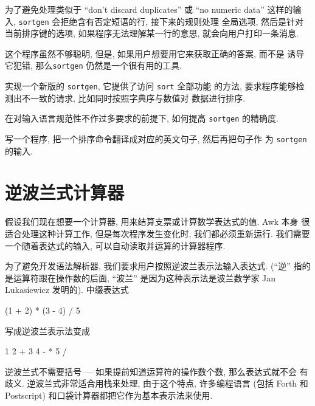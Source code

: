 
为了避免处理类似于 ``don't discard duplicates'' 或 ``no numeric data'' 
这样的输入, \texttt{sortgen} 会拒绝含有否定短语的行, 接下来的规则处理
全局选项, 然后是针对当前排序键的选项, 如果程序无法理解某一行的意思,
就会向用户打印一条消息.

这个程序虽然不够聪明, 但是, 如果用户想要用它来获取正确的答案, 而不是
诱导它犯错, 那么\texttt{sortgen} 仍然是一个很有用的工具.

\begin{exercise}
    实现一个新版的 \texttt{sortgen}, 它提供了访问 \texttt{sort} 全部功能
    的方法, 要求程序能够检测出不一致的请求, 比如同时按照字典序与数值对
    数据进行排序.
\end{exercise}

\begin{exercise}
    在对输入语言规范性不作过多要求的前提下, 如何提高 \texttt{sortgen} 
    的精确度.
\end{exercise}

\begin{exercise}
    写一个程序, 把一个排序命令翻译成对应的英文句子, 然后再把句子作
    为 \texttt{sortgen} 的输入.
\end{exercise}

\section{逆波兰式计算器}
\label{sec:a_reverse_polish_calculator}

假设我们现在想要一个计算器, 用来结算支票或计算数学表达式的值. Awk 本身
很适合处理这种计算工作, 但是每次程序发生变化时, 我们都必须重新运行.
我们需要一个随着表达式的输入, 可以自动读取并运算的计算器程序.

为了避免开发语法解析器, 我们要求用户按照逆波兰表示法输入表达式. (``逆''
指的是运算符跟在操作数的后面, ``波兰'' 是因为这种表示法是波兰数学家
Jan Lukasiewicz 发明的). 中缀表达式
\begin{shell}
    (1 + 2) * (3 - 4) / 5
\end{shell}
写成逆波兰表示法变成
\begin{shell}
    1 2 + 3 4 - * 5 /
\end{shell}
逆波兰式不需要括号 --- 如果提前知道运算符的操作数个数, 那么表达式就不会
有歧义. 逆波兰式非常适合用栈来处理, 由于这个特点, 许多编程语言 (包括
Forth 和 Postscript) 和口袋计算器都把它作为基本表示法来使用.

